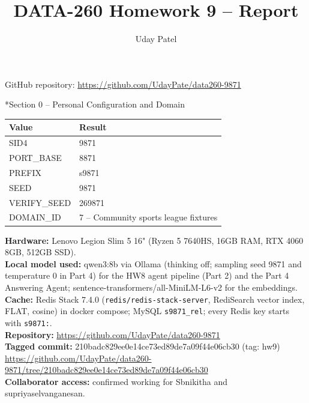 \documentclass[11pt]{article}
\title{DATA-260 Homework 9 -- Report}
\author{Uday Patel}
\date{}
\makeatletter
\renewcommand\section{\@startsection{section}{1}{\z@}{-3.0ex \@plus -1ex \@minus -.2ex}{1.2ex \@plus.2ex}{\normalfont\fontsize{14}{17}\selectfont\bfseries}}
\makeatother
\begin{document}
\maketitle
\begin{center}GitHub repository: \url{https://github.com/UdayPate/data260-9871}\end{center}

\section*{Section 0 -- Personal Configuration and Domain}
\begin{tabular}{|l|l|}\hline
\textbf{Value} & \textbf{Result} \\\hline
SID4 & 9871 \\\hline
PORT\_BASE & 8871 \\\hline
PREFIX & s9871 \\\hline
SEED & 9871 \\\hline
VERIFY\_SEED & 269871 \\\hline
DOMAIN\_ID & 7 -- Community sports league fixtures \\\hline
\end{tabular}
\vspace{1em}

\textbf{Hardware:} Lenovo Legion Slim 5 16" (Ryzen 5 7640HS, 16GB RAM, RTX 4060 8GB, 512GB SSD). \\
\textbf{Local model used:} qwen3:8b via Ollama (thinking off; sampling seed 9871 and temperature 0 in Part 4) for the HW8 agent pipeline (Part 2) and the Part 4 Answering Agent; sentence-transformers/all-MiniLM-L6-v2 for the embeddings. \\
\textbf{Cache:} Redis Stack 7.4.0 (\texttt{redis/redis-stack-server}, RediSearch vector index, FLAT, cosine) in docker compose; MySQL \texttt{s9871\_rel}; every Redis key starts with \texttt{s9871:}. \\
\textbf{Repository:} \url{https://github.com/UdayPate/data260-9871} \\
\textbf{Tagged commit:} 210badc829ee0e14ce73ed89de7a09f44e06cb30 (tag: hw9) \\
{\footnotesize\url{https://github.com/UdayPate/data260-9871/tree/210badc829ee0e14ce73ed89de7a09f44e06cb30}} \\
\textbf{Collaborator access:} confirmed working for Sbnikitha and supriyaselvanganesan.
\end{document}
